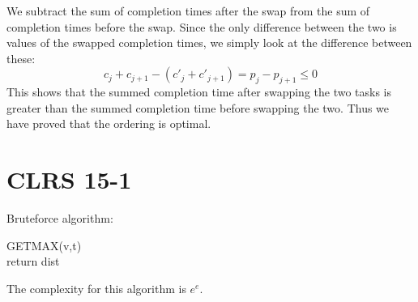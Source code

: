 We subtract the sum of completion times after the swap from the sum of completion times before the swap.
Since the only difference between the two is values of the swapped completion times, we simply look at the difference between these:
$$c_j + c_{j+1} - (c'_j + c'_{j+1})= p_j - p_{j + 1} \leq 0$$
This shows that the summed completion time after swapping the two tasks is greater than the summed completion time before swapping the two.
Thus we have proved that the ordering is optimal.

\section*{CLRS 15-1}
Bruteforce algorithm:

\begin{algorithm}[H]
GETMAX(v,t)
\\
return dist
\end{algorithm}
The complexity for this algorithm is $e^e$.
